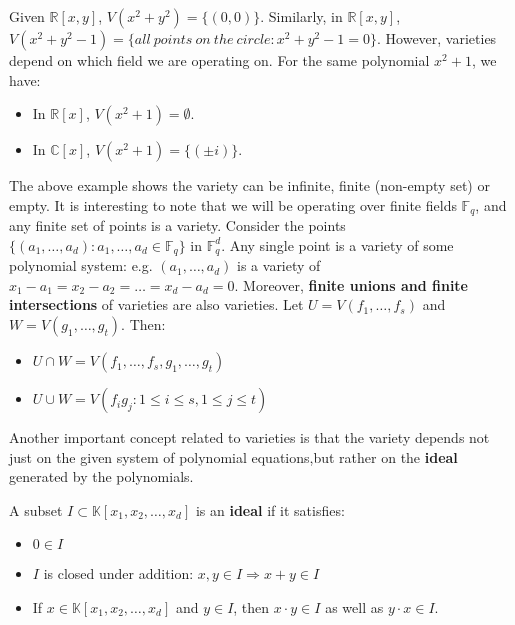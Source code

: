 \begin{Example}
Given $\mathbb{R}\left[x,y\right]$, $V(x^2+y^2)=\{(0,0)\}$. 
Similarly, in $\mathbb{R}\left[x,y\right]$, $V(x^2+y^2-1)=\{all\  points\  on\ the\ circle: x^2+y^2-1=0\}$.
However, varieties depend on which field we are operating on. For the same polynomial $x^2+1$, we have:
\begin{itemize}
\item In $\mathbb{R}[x]$, $V(x^2+1)=\emptyset$.
\item In $\mathbb{C}[x]$, $V(x^2+1)=\{(\pm i)\}$.
\end{itemize}
\end{Example}

The above example shows the variety can be infinite, finite (non-empty set) or empty.
It is interesting to note that we will be operating over finite fields $\mathbb{F}_{q}$, 
and any finite set of points is a variety.  
Consider the points $\{(a_1,\dots, a_d): a_1, \dots, a_d \in \mathbb{F}_q\}$
in $\mathbb{F}_q^d$. Any single point is a variety of some polynomial system:
e.g. $(a_1,\dots, a_d)$ is a variety of $x_1-a_1 = x_2 - a_2 = \dots =
x_d-a_d=0$. Moreover, {\bf finite unions and finite  intersections} of
varieties are also varieties. Let $U = V(f_1, \dots, f_s)$ and $W =
V(g_1, \dots, g_t)$. Then:  
\begin{itemize}
\item $U \cap W = V(f_1, \dots, f_s, g_1, \dots, g_t)$
\item $U \cup W = V(f_i g_j: 1 \leq i \leq s, 1 \leq j \leq t)$
\end{itemize}

Another important concept related to varieties is that the variety depends not just on the given system of polynomial equations,but
rather on the {\bf ideal} generated by the polynomials.

\begin{Definition} 
A subset $I \subset \mathbb{K}[x_1, x_2, \ldots, x_d]$ is an {\bf ideal} if it satisfies:
\begin{itemize}
\item $0 \in I$
\item $I$ is closed under addition: $x, y \in I \Rightarrow x+y \in I$
\item If $x \in \mathbb{K}[x_1, x_2, \ldots, x_d]$ and $y \in I$, then $x\cdot y \in I$ as well as $y\cdot x \in  I$.
\end{itemize}
\end{Definition}

